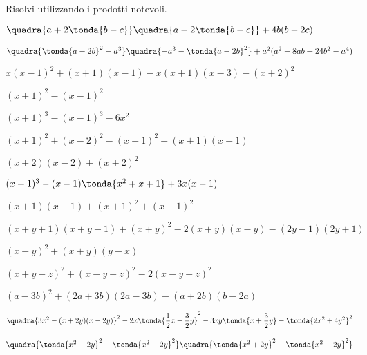 \begin{esercizio}[*]
\label{ese:11.31}
Risolvi utilizzando i prodotti notevoli.
\begin{enumeratea}
\spazielenx
\item 
\(\quadra{a+2\tonda{b-c}}\quadra{a-2\tonda{b-c}}+4b(b-2c)\)
\item 
\(\quadra{\tonda{a-2b}^{2}-a^{3}}\quadra{-a^{3}-\tonda{a-2b}^2}
+a^{2}(a^{2}-8{ab}+24b^{2}-a^{4})\)
\item \(x(x-1)^{2}+(x+1)(x-1)-x(x+1)(x-3)-(x+2)^{2}\)
\item \((x+1)^{2}-(x-1)^{2}\)
\item \((x+1)^{3}-(x-1)^{3}-6x^2\)
\item \((x+1)^{2}+(x-2)^{2}-(x-1)^{2}-(x+1)(x-1)\)
\item \((x+2)(x-2)+(x+2)^{2}\)
\item \((x+1)^{3}-(x-1)\tonda{x^{2}+x+1}+3x(x-1)\)
\item \((x+1)(x-1)+(x+1)^{2}+(x-1)^{2}\)
\item \((x+y+1)(x+y-1)+(x+y)^{2}-2(x+y)(x-y)-(2y-1)(2y+1)\)
% 
% 
% 
\item \((x-y)^{2}+(x+y)(y-x)\)
\item \((x+y-z)^2+(x-y+z)^2-2(x-y-z)^2\)
\item \((a-3b)^{2}+(2a+3b)(2a-3b)-(a+2b)(b-2a)\)
\item 
\(\quadra{3x^{2}-(x+2y)(x-2y)}^{2}-2x\tonda{\dfrac{1}{2}x-\dfrac{3}{2}
y}^{2}-3{xy}\tonda{x+\dfrac{3}{2}y}-\tonda{2x^{2}+4y^{2}}^{2}\)\\
\item 
\(\quadra{\tonda{x^{2}+2y}^{2}-\tonda{x^{2}-2y}^{2}}\quadra{
\tonda{x^{2}+2y}^{2}+\tonda{x^{2}-2y}^{2}}\)

\end{enumeratea}
\end{esercizio}
